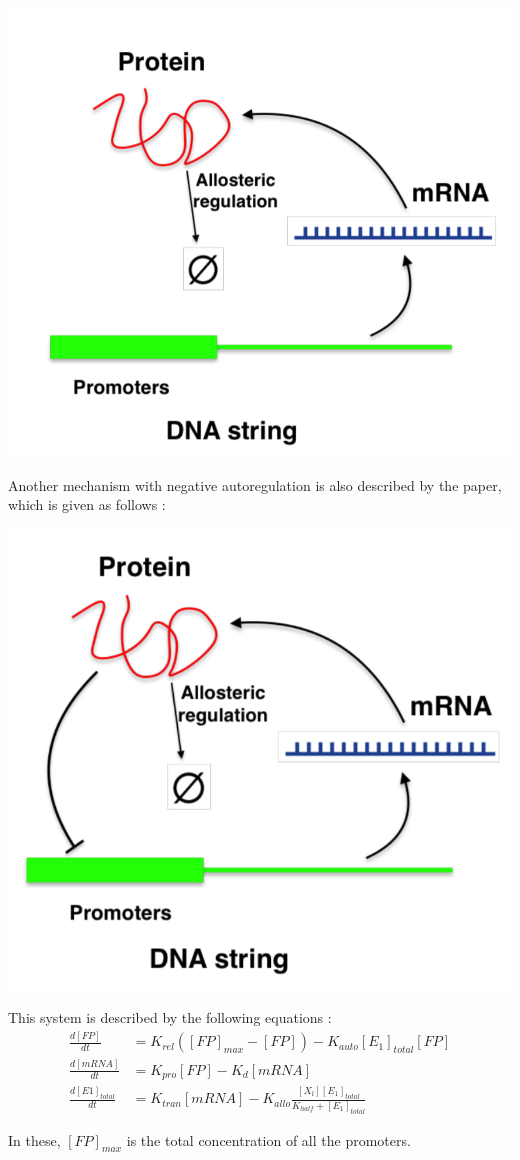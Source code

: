 \begin{center}
    \includegraphics[scale=0.4]{img/dna-noneg.png}
\end{center}

\noindent Another mechanism with negative autoregulation is 
also described by the paper, which is given as follows :

\begin{center}
    \includegraphics[scale=0.4]{img/dna-neg.png}
\end{center}

\noindent This system is described by the following equations :
\begin{align*}
    \frac{d[FP]}{dt} &= K_{rel}([FP]_{max} - [FP]) - K_{auto}[E_1]_{total}[FP]\\
    \frac{d[mRNA]}{dt} &= K_{pro}[FP] - K_d[mRNA]\\
    \frac{d[E1]_{total}}{dt} &= K_{tran}[mRNA] - K_{allo}\frac{[X_l][E_1]_{total}}{K_{half} + [E_1]_{total}}
\end{align*}

\noindent In these, $[FP]_{max}$ is the total concentration of 
all the promoters.